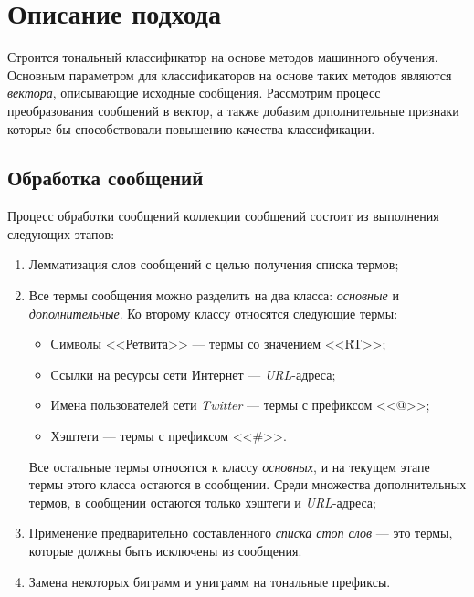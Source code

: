 \section{Описание подхода}
    \label{sec:buildingApproachDescription}
    Строится тональный классификатор на основе методов машинного обучения.
    Основным параметром для классификаторов на основе таких методов
    являются {\it вектора}, описывающие исходные сообщения.
    Рассмотрим процесс преобразования сообщений в вектор, а также добавим
    дополнительные признаки которые бы способствовали повышению качества
    классификации.

    \subsection{Обработка сообщений}
    \label{sec:buildingMsgProcessing}
    Процесс обработки сообщений коллекции сообщений состоит из выполнения
    следующих этапов:
    \begin{enumerate}
        \item Лемматизация слов сообщений с целью получения списка термов;

        \item Все термы сообщения можно разделить на два класса: {\it основные} и
            {\it дополнительные}.
            Ко второму классу относятся следующие термы:
            \begin{itemize}
                \item Символы <<Ретвита>> --- термы со значением <<RT>>;
                \item Ссылки на ресурсы сети Интернет --- {\it URL\hspace{1pt}}-адреса;
                \item Имена пользователей сети {\it Twitter} --- термы с префиксом <<@>>;
                \item Хэштеги --- термы с префиксом <<\#>>.
            \end{itemize}
            Все остальные термы относятся к классу {\it основных}, и на текущем этапе
            термы этого класса остаются в сообщении. Среди множества дополнительных
            термов, в сообщении остаются только хэштеги и {\it URL\hspace{1pt}}-адреса;

        \item Применение предварительно составленного {\it списка стоп слов} ---
            это термы, которые должны быть исключены из сообщения.
        \item Замена некоторых биграмм и униграмм на тональные префиксы.
    \end{enumerate}


